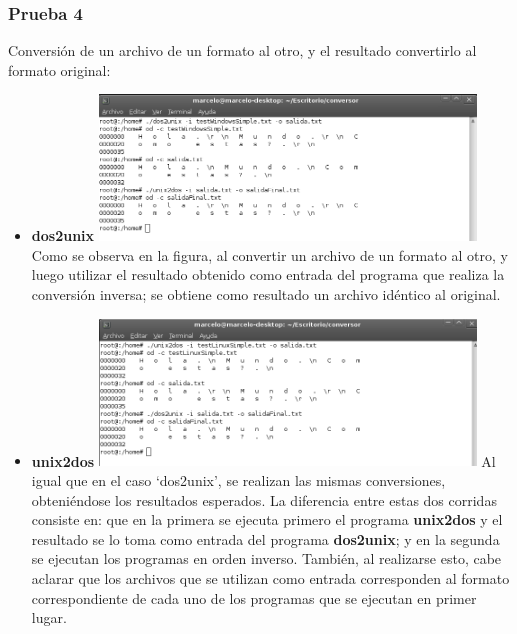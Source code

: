 \documentclass[a4paper,10pt]{article}
\begin{document}
    \subsubsection{Prueba 4}
    Conversi\'on de un archivo de un formato al otro, y el resultado convertirlo al formato original:
      \begin{itemize}
      \item \textbf{dos2unix}
      \newline
      \includegraphics[width=10cm, viewport=0 0 842 328]{../Informe/Imagenes/prueba4-archivo-dos2unix.png}	
      \newline
      Como se observa en la figura, al convertir un archivo de un formato al otro, y luego utilizar el resultado obtenido como
      entrada del programa que realiza la conversi\'on inversa; se obtiene como resultado un archivo id\'entico al original.
      \item \textbf{unix2dos}
      \newline
      \includegraphics[width=10cm, viewport=0 0 838 328]{../Informe/Imagenes/prueba4-archivo-unix2dos.png}	
      \newline
      Al igual que en el caso `dos2unix', se realizan las mismas conversiones, obteni\'endose los resultados esperados. La diferencia
      entre estas dos corridas consiste en: que en la primera se ejecuta primero el programa {\bf unix2dos} y el resultado se lo toma como
      entrada del programa {\bf dos2unix}; y en la segunda se ejecutan los programas en orden inverso. Tambi\'en, al realizarse esto, cabe aclarar
      que los archivos que se utilizan como entrada corresponden al formato correspondiente de cada uno de los programas que se ejecutan en primer
      lugar.
      
      \end{itemize}
\end{document}
